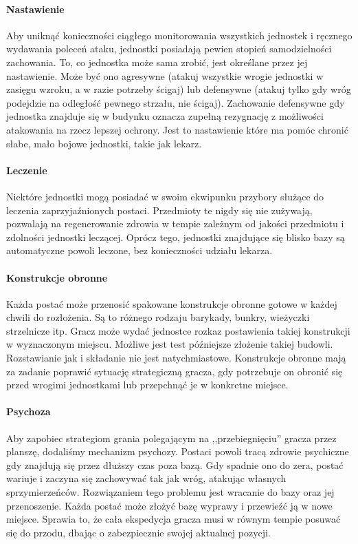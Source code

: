 \documentclass[licencjacka]{pracamgr}
\begin{document}
      \paragraph{Nastawienie}
	Aby uniknąć konieczności ciągłego monitorowania wszystkich jednostek i ręcznego wydawania poleceń ataku, jednostki posiadają pewien
	stopień samodzielności zachowania. To, co jednostka może sama zrobić, jest określane przez jej nastawienie. Może być ono agresywne
	(atakuj wszystkie wrogie jednostki w zasięgu wzroku, a w razie potrzeby ścigaj) lub defensywne (atakuj tylko gdy wróg podejdzie na
	odległość pewnego strzału, nie ścigaj). Zachowanie defensywne gdy jednostka znajduje się w budynku oznacza zupełną rezygnację z
	możliwości atakowania na rzecz lepszej ochrony. Jest to nastawienie które ma pomóc chronić słabe, mało bojowe jednostki, takie jak lekarz.
      \paragraph{Leczenie}
	Niektóre jednostki mogą posiadać w swoim ekwipunku przybory służące do leczenia zaprzyjaźnionych postaci. Przedmioty te nigdy się nie zużywają,
	pozwalają na regenerowanie zdrowia w tempie zależnym od jakości przedmiotu i zdolności jednostki leczącej. Oprócz tego, jednostki znajdujące się
	blisko bazy są automatyczne powoli leczone, bez konieczności udziału lekarza.
      \paragraph{Konstrukcje obronne}
	Każda postać może przenosić spakowane konstrukcje obronne gotowe w każdej chwili do rozłożenia. Są to różnego rodzaju barykady, bunkry, wieżyczki
	strzelnicze itp. Gracz może wydać jednostce rozkaz postawienia takiej konstrukcji w wyznaczonym miejscu. Możliwe jest test późniejsze złożenie takiej
	budowli. Rozstawianie jak i składanie nie jest natychmiastowe. Konstrukcje obronne mają za zadanie poprawić sytuację strategiczną gracza, 
	gdy potrzebuje on obronić się przed wrogimi jednostkami lub przepchnąć je w konkretne miejsce.
      \paragraph{Psychoza}
	Aby zapobiec strategiom grania polegającym na ,,przebiegnięciu'' gracza przez planszę, dodaliśmy mechanizm psychozy. Postaci
	powoli tracą zdrowie psychiczne gdy znajdują się przez dłuższy czas poza bazą. Gdy spadnie ono do zera, postać wariuje i
	zaczyna się zachowywać tak jak wróg, atakując własnych sprzymierzeńców. Rozwiązaniem tego problemu jest wracanie do bazy oraz jej przenoszenie.
	Każda postać może złożyć bazę wyprawy i przewieźć ją w nowe miejsce. Sprawia to, że cała ekspedycja gracza musi w równym tempie posuwać się
	do przodu, dbając o zabezpiecznie swojej aktualnej pozycji.
\end{document}

